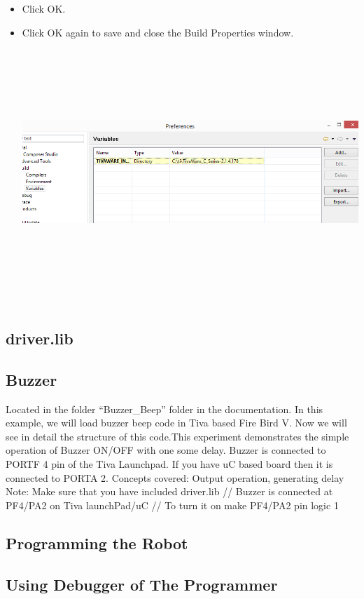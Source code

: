 \documentclass[a4paper,10pt,oneside]{article}
\begin{document}
\begin{itemize}
						\item  Click OK.
						\item  Click OK again to save and close
						the Build Properties window.\\
						\includegraphics[width=20cm,height=10cm]{AddVariables9}
					\end{itemize}
		\subsection{\huge \textbf{driver.lib}}
		\subsection{\huge \textbf{Buzzer}}
		{
			Located in the folder “Buzzer\_Beep” folder in the documentation.
			In this example, we will load buzzer beep code in Tiva based Fire Bird V. Now we will see in
			detail the structure of this code.This experiment demonstrates the simple operation of Buzzer ON/OFF with one some delay.
			Buzzer is connected to PORTF 4 pin of the Tiva Launchpad. If you have uC based board then it is connected to PORTA 2.
			Concepts covered: Output operation, generating delay
			Note: Make sure that you have included  driver.lib
			// Buzzer is connected at PF4/PA2 on Tiva launchPad/uC
			// To turn it on make PF4/PA2 pin logic 1
			
		}
		\subsection{\huge \textbf{Programming the Robot}}
		\subsection{\huge \textbf{Using Debugger of The Programmer}}
\end{document}
